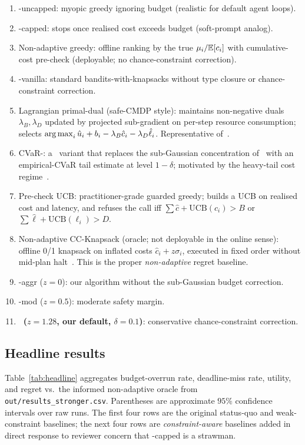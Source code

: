 \begin{enumerate}
  \item \ReAct-uncapped: myopic greedy ignoring budget (realistic for
    default agent loops).
  \item \ReAct-capped: stops once realised cost exceeds budget
    (soft-prompt analog).
  \item Non-adaptive greedy: offline ranking by the true
    $\mu_i / \mathbb{E}[c_i]$ with cumulative-cost pre-check (deployable; no
    chance-constraint correction).
  \item \BwK-vanilla: standard bandits-with-knapsacks without type
    closure or chance-constraint correction.
  \item Lagrangian primal-dual (safe-CMDP style): maintains non-negative
    duals $\lambda_B, \lambda_D$ updated by projected sub-gradient on
    per-step resource consumption; selects
    $\operatorname*{arg\,max}_i \hat{u}_i + b_i - \lambda_B \hat{c}_i - \lambda_D \hat{\ell}_i$.
    Representative of~\cite{mahdavi2012tradeoff,agrawal2014bwk}.
  \item CVaR-\BwK: a \BwK~variant that replaces the sub-Gaussian
    concentration of~\cite{bwk2018} with an empirical-CVaR tail
    estimate at level $1-\delta$; motivated by the heavy-tail cost
    regime~\cite{tamkin2020cvar}.
  \item Pre-check UCB: practitioner-grade guarded greedy; builds a
    UCB on realised cost and latency, and refuses the call iff
    $\sum \hat{c} + \mathrm{UCB}(c_i) > B$ or
    $\sum \hat{\ell} + \mathrm{UCB}(\ell_i) > D$.
  \item Non-adaptive CC-Knapsack (oracle; not deployable in the online
    sense): offline 0/1 knapsack on inflated costs
    $\hat{c}_i + z \sigma_i$, executed in fixed order without
    mid-plan halt~\cite{kleinberg2000stochasticpacking}. This is the
    proper \emph{non-adaptive} regret baseline.
  \item \CBUC-aggr ($z=0$): our algorithm without the sub-Gaussian
    budget correction.
  \item \CBUC-mod ($z=0.5$): moderate safety margin.
  \item \textbf{\CBUC~($z=1.28$, our default, $\delta=0.1$)}:
    conservative chance-constraint correction.
\end{enumerate}

\subsection{Headline results}
Table~\ref{tab:headline} aggregates budget-overrun rate,
deadline-miss rate, utility, and regret vs.\ the informed non-adaptive
oracle from \texttt{out/results\_stronger.csv}. Parentheses are
approximate $95\%$ confidence intervals over raw runs. The first four
rows are the original status-quo and weak-constraint baselines; the
next four rows are \emph{constraint-aware} baselines added in direct
response to reviewer concern that \ReAct-capped is a strawman.

